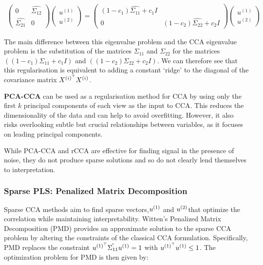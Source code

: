 \begin{align}
    \begin{pmatrix}
        0 & \hat{\Sigma_{12}} \\
        \hat{\Sigma_{21}} & 0 
    \end{pmatrix} \begin{pmatrix}
        u^{(1)} \\
        u^{(2)}
    \end{pmatrix}= \begin{pmatrix}
        (1-c_1)\hat{\Sigma_{11}} + c_1I \\
        0 & (1-c_2)\hat{\Sigma_{22}} + c_2I
    \end{pmatrix}\begin{pmatrix}
        u^{(1)} \\
        u^{(2)}
    \end{pmatrix}
\end{align}

The main difference between this eigenvalue problem and the CCA eigenvalue problem is the substitution of the matrices \(\Sigma_{11}\) and \(\Sigma_{22}\) for the matrices \( ((1-c_1) \Sigma_{11} + c_1 I) \) and \( ((1-c_2) \Sigma_{22} + c_2 I) \).
We can therefore see that this regularisation is equivalent to adding a constant `ridge' to the diagonal of the covariance matrix \(X^{(i)^{\top}} X^{(i)}\).

\textbf{PCA-CCA} can be used as a regularisation method for CCA by using only the first \( k \) principal components of each view as the input to CCA.
This reduces the dimensionality of the data and can help to avoid overfitting.
However, it also risks overlooking subtle but crucial relationships between variables, as it focuses on leading principal components.

While PCA-CCA and rCCA are effective for finding signal in the presence of noise, they do not produce sparse
solutions and so do not clearly lend themselves to interpretation.

\subsubsection{Sparse PLS: Penalized Matrix Decomposition}
Sparse CCA methods aim to find sparse vectors,\(u^{(1)}\) and \(u^{(2)}\)that optimize the correlation while maintaining interpretability. Witten's Penalized Matrix Decomposition (PMD) \cite{witten2009penalized} provides an approximate solution to the sparse CCA problem by altering the constraints of the classical CCA formulation.
Specifically, PMD replaces the constraint \(u^{(1)^{\top}} \hat{\Sigma_{11}} u^{(1)} = 1\) with \(u^{(1)^{\top}} u^{(1)} \leq 1\).
The optimization problem for PMD is then given by:

